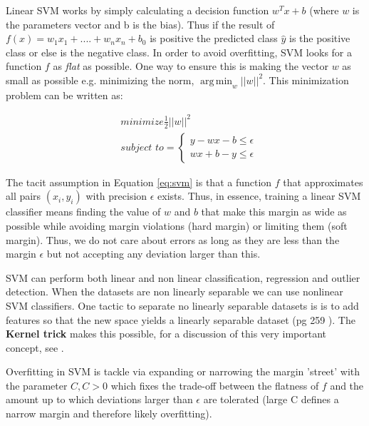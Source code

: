 \documentclass[11pt]{article}
\theoremstyle{definition}
\theoremstyle{remark}
\DeclareMathOperator*{\argmin}{arg\,min}
\begin{document}
Linear SVM works by simply calculating a decision function $w^Tx +b$ (where $w$ is the parameters vector and b is the bias). Thus if the result of $f(x) = w_{1} x_{1} + ....+ w_{n}x_{n} + b_0$ is positive the predicted class $\hat{y}$ is the positive class or else is the negative class. In order to avoid overfitting, SVM looks for a function $f$ as \emph{flat} as possible. One way to ensure this is making the vector $w$ as small as possible e.g. minimizing the norm, $\argmin_{w} ||w||^2$. This minimization problem can be written as:

\begin{equation}\label{eq:svm}
\begin{aligned}
 & \textit{minimize} \frac{1}{2} ||w||^2 \\
 & \textit{subject to}=
 \begin{cases}
    y - wx -b \leq \epsilon \\
    wx +b - y \leq \epsilon
  \end{cases}
  \end{aligned}
\end{equation}

The tacit assumption in Equation \ref{eq:svm} is that a function $f$ that approximates all pairs $(x_i, y_i)$ with precision $\epsilon$ exists.
Thus, in essence, training a linear SVM classifier means finding the value of $w$ and $b$ that make this margin as wide as possible while avoiding margin violations (hard margin) or limiting them (soft margin). Thus, we do not care about errors as long as they are less than the margin $\epsilon$ but not accepting any deviation larger than this. 
 
SVM can perform both linear and non linear classification, regression and outlier detection. When the datasets are non linearly separable we can use nonlinear SVM classifiers. One tactic to separate no linearly separable datasets is is to add features so that the new space yields a linearly separable dataset (pg 259 \cite{geron2017hands}). The \textbf{Kernel trick} makes this possible, for a discussion of this very important concept, see \cite{vapnik2013nature}. 

Overfitting in SVM is tackle via expanding or narrowing the margin 'street' with the parameter $C, C > 0$ which fixes the trade-off between the flatness of $f$ and the amount up to which deviations larger than $\epsilon$ are tolerated \cite{smola2004tutorial} (large C defines a narrow margin and therefore likely overfitting). 

\end{document}
